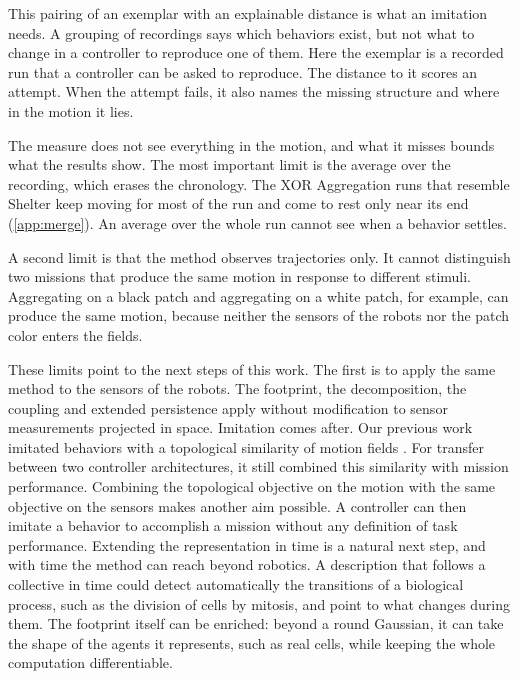 \documentclass[pdflatex,sn-apa]{sn-jnl}
\begin{document}
This pairing of an exemplar with an explainable distance is what an imitation needs. A grouping of recordings says
which behaviors exist, but not what to change in a controller to reproduce one of them. Here the exemplar is a recorded
run that a controller can be asked to reproduce. The distance to it scores an attempt. When the attempt fails, it also
names the missing structure and where in the motion it lies.

The measure does not see everything in the motion, and what it misses bounds what the results show. The most
important limit is the average over the recording, which erases the chronology. The XOR Aggregation runs that resemble
Shelter keep moving for most of the run and come to rest only near its end (\cref{app:merge}). An average over the
whole run cannot see when a behavior settles.

A second limit is that the method observes trajectories only. It cannot distinguish two missions that produce the same
motion in response to different stimuli. Aggregating on a black patch and aggregating on a white patch, for example,
can produce the same motion, because neither the sensors of the robots nor the patch color enters the fields.

These limits point to the next steps of this work. The first is to apply the same method to the sensors of the robots.
The footprint, the decomposition, the coupling and extended persistence apply without modification to sensor
measurements projected in space. Imitation comes after. Our previous work imitated behaviors with a topological
similarity of motion fields \citep{ndinga2025thesis}. For transfer between two controller architectures, it still
combined this similarity with mission performance. Combining the topological objective on the motion with the same
objective on the sensors makes another aim possible. A controller can then imitate a behavior to accomplish a mission
without any definition of task performance. Extending the representation in time is a natural next step, and with time the method can
reach beyond robotics. A description that follows a collective in time could detect automatically the transitions of a
biological process, such as the division of cells by mitosis, and point to what changes during them. The footprint
itself can be enriched: beyond a round Gaussian, it can take the shape of the agents it represents, such as real cells,
while keeping the whole computation differentiable.

\FloatBarrier
\end{document}
